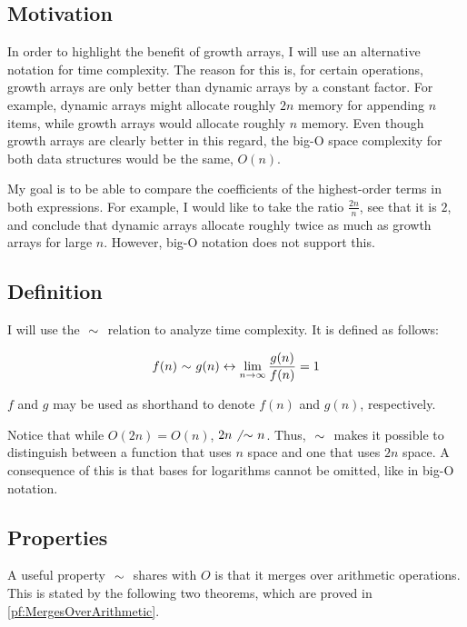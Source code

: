 \subsection{Motivation}

In order to highlight the benefit of growth arrays, I will use an alternative notation for time complexity. The reason for this is, for certain operations, growth arrays are only better than dynamic arrays by a constant factor. For example, dynamic arrays might allocate roughly $2n$ memory for appending $n$ items, while growth arrays would allocate roughly $n$ memory. Even though growth arrays are clearly better in this regard, the big-O space complexity for both data structures would be the same, $O(n)$.

My goal is to be able to compare the coefficients of the highest-order terms in both expressions. For example, I would like to take the ratio $\frac{2n}{n}$, see that it is $2$, and conclude that dynamic arrays allocate roughly twice as much as growth arrays for large $n$. However, big-O notation does not support this.

\subsection{Definition}

I will use the $\ \mathtt{\sim}\ $ relation to analyze time complexity. It is defined as follows:

\begin{align*}
f(n) \ \mathtt{\sim}\  g(n) \leftrightarrow \lim_{n \to \infty} \frac{g(n)}{f(n)} = 1
\end{align*}

$f$ and $g$ may be used as shorthand to denote $f(n)$ and $g(n)$, respectively.

Notice that while $O(2n) = O(n)$, $2n \not\ \mathtt{\sim}\  n$. Thus, $\ \mathtt{\sim}\ $ makes it possible to distinguish between a function that uses $n$ space and one that uses $2n$ space. \HdrNote A consequence of this is that bases for logarithms cannot be omitted, like in big-O notation.

\subsection{Properties}
\label{subsec:AsymptoticProperties}

A useful property $\ \mathtt{\sim}\ $ shares with $O$ is that it merges over arithmetic operations. This is stated by the following two theorems, which are proved in \ref{pf:MergesOverArithmetic}.

